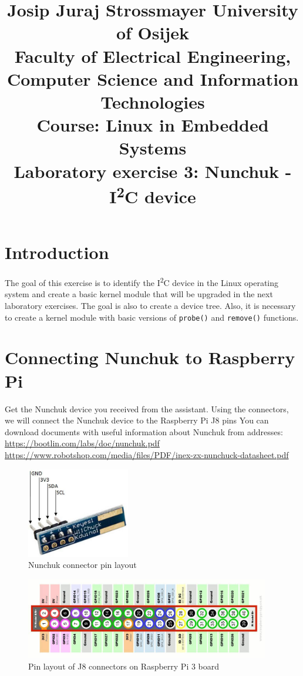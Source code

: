 \documentclass[11pt]{article}
\title{
	\Large Josip Juraj Strossmayer University of Osijek \\
	Faculty of Electrical Engineering, Computer Science and Information
	 Technologies\\
	\vspace{4cm}
	\Large Course: Linux in Embedded Systems \\
	\vspace{4cm}
	\Large \textbf{Laboratory exercise 3: Nunchuk - I\textsuperscript{2}C device}
	}
\date{}
\begin{document}
\maketitle
\thispagestyle{empty}
\newpage

\section{Introduction}
The goal of this exercise is to identify the I\textsuperscript{2}C device in
the Linux operating system and create a basic kernel module that will be
upgraded in the next laboratory exercises. The goal is also to create a device
tree. Also, it is necessary to create a kernel module with basic versions of
\texttt{probe()} and \texttt{remove()} functions.

\section{Connecting Nunchuk to Raspberry Pi}
Get the Nunchuk device you received from the assistant.
Using the connectors, we will connect the Nunchuk device to the Raspberry Pi J8
pins
You can download documents with useful information about Nunchuk from
addresses:\\
\url{https://bootlin.com/labs/doc/nunchuk.pdf}\\
\url{https://www.robotshop.com/media/files/PDF/inex-zx-nunchuck-datasheet.pdf}\\

\begin{figure}[h!]
\centering
\includegraphics[width=0.4\textwidth]{nunchuk-connector.jpg}
\captionsetup{justification=centering}
\caption{Nunchuk connector pin layout}
\end{figure}

\begin{figure}[h!]
\centering
\includegraphics[width=0.95\textwidth]{j8-rpi.jpg}
\captionsetup{justification=centering}
\caption{Pin layout of J8 connectors on Raspberry Pi 3 board}
\end{figure}
\end{document}
